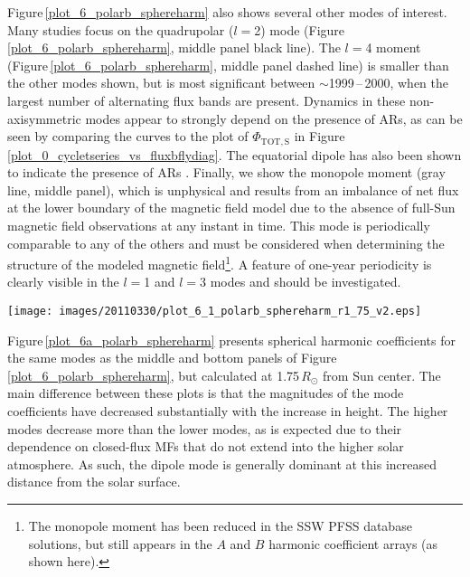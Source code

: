 \documentclass[namedreferences]{solarphysics}
\newcommand{\degr}{\ensuremath{^\circ}}
\begin{document}
\begin{article}
Figure\,\ref{plot_6_polarb_sphereharm} also shows several other modes of interest. Many studies \citep[e.g.,][]{mordvinov:2007,DeRosa:2012} focus on the quadrupolar ($l$$=$2) mode (Figure\,\ref{plot_6_polarb_sphereharm}, middle panel black line).
The $l$$=$4 moment (Figure\,\ref{plot_6_polarb_sphereharm}, middle panel dashed line) is smaller than the other modes shown, but is most significant between $\sim$1999\,--\,2000, when the largest number of alternating flux bands are present. Dynamics in these non-axisymmetric modes appear to strongly depend on the presence of ARs, as can be seen by comparing the curves to the plot of $\Phi_{\mathrm{TOT,S}}$ in Figure\,\ref{plot_0_cycletseries_vs_fluxbflydiag}. The equatorial dipole has also been shown to indicate the presence of ARs \citep{Petrie:2013}. Finally, we show the monopole moment (gray line, middle panel), which is unphysical and results from an imbalance of net flux at the lower boundary of the magnetic field model due to the absence of full-Sun magnetic field observations at any instant in time. This mode is periodically comparable to any of the others and must be considered when determining the structure of the modeled magnetic field\footnote{The monopole moment has been reduced in the SSW PFSS database solutions, but still appears in the $A$ and $B$ harmonic coefficient arrays (as shown here).}. A feature of one-year periodicity is clearly visible in the $l$$=$1 and  $l$$=$3 modes and should be investigated.


\begin{figure*}[!t]

\texttt{[image: images/20110330/plot\_6\_1\_polarb\_sphereharm\_r1\_75\_v2.eps]}
\caption{PFSS spherical harmonic coefficients as in the middle and bottom panels of Figure\,\ref{plot_6_polarb_sphereharm}, but calculated at a height of 1.75\,$R_{\odot}$ from Sun center.}
\label{plot_6a_polarb_sphereharm}
\end{figure*}

Figure\,\ref{plot_6a_polarb_sphereharm} presents spherical harmonic coefficients for the same modes as the middle and bottom panels of Figure\,\ref{plot_6_polarb_sphereharm}, but calculated at 1.75\,$R_{\odot}$ from Sun center. The main difference between these plots is that the magnitudes of the mode coefficients have decreased substantially with the increase in height. The higher modes decrease more than the lower modes, as is expected due to their dependence on closed-flux MFs that do not extend into the higher solar atmosphere. As such, the dipole mode is generally dominant at this increased distance from the solar surface. 


\end{article}
\end{document}
